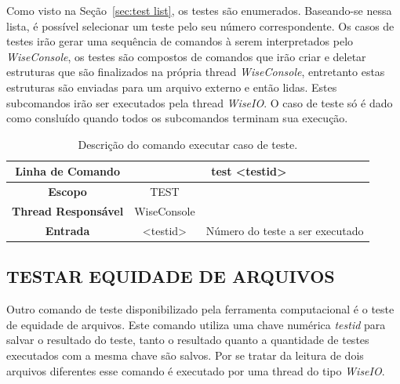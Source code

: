 Como visto na Seção~\ref{sec:test list}, os testes são enumerados. Baseando-se nessa lista, é possível selecionar um teste pelo seu número correspondente. Os casos de testes irão gerar uma sequência de comandos à serem interpretados pelo \textit{WiseConsole}, os testes são compostos de comandos que irão criar e deletar estruturas que são finalizados na própria thread \textit{WiseConsole}, entretanto estas estruturas são enviadas para um arquivo externo e então lidas. Estes subcomandos irão ser executados pela thread \textit{WiseIO}. O caso de teste só é dado como consluído quando todos os subcomandos terminam sua execução.

\begin{center}
	\begin{table}[!htbp]
		\begin{tabular}{|c|c|m{}|}
			\hline
			\textbf{Linha de Comando} & \multicolumn{2}{c|}{test <test\underline{\space}id>} \\
			\hline
			\textbf{Escopo} & \multicolumn{1}{c|}{TEST} \\
			\hline
			\textbf{Thread Responsável} & \multicolumn{1}{c|}{WiseConsole} \\
			\hline
			\textbf{Entrada} & <test\underline{\space}id> & Número do teste a ser executado \\
			\hline
		\end{tabular}
		\caption{Descrição do comando executar caso de teste.}
		\label{tab:case_test}
	\end{table}
\end{center}

\subsection{TESTAR EQUIDADE DE ARQUIVOS}\label{sec:test_file}

Outro comando de teste disponibilizado pela ferramenta computacional é o teste de equidade de arquivos. Este comando utiliza uma chave numérica \textit{test\underline{\space}id} para salvar o resultado do teste, tanto o resultado quanto a quantidade de testes executados com a mesma chave são salvos. Por se tratar da leitura de dois arquivos diferentes esse comando é executado por uma thread do tipo \textit{WiseIO}.

